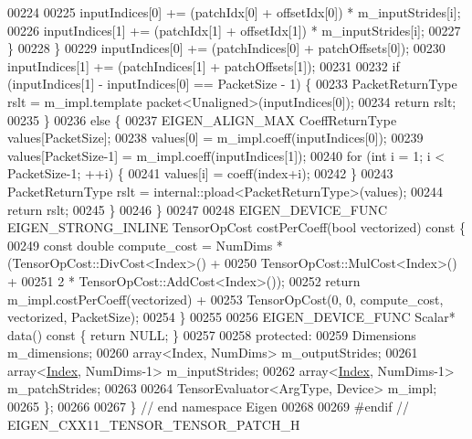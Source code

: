 \begin{DoxyCode}
00224 
00225         inputIndices[0] += (patchIdx[0] + offsetIdx[0]) * m\_inputStrides[i];
00226         inputIndices[1] += (patchIdx[1] + offsetIdx[1]) * m\_inputStrides[i];
00227       \}
00228     \}
00229     inputIndices[0] += (patchIndices[0] + patchOffsets[0]);
00230     inputIndices[1] += (patchIndices[1] + patchOffsets[1]);
00231 
00232     \textcolor{keywordflow}{if} (inputIndices[1] - inputIndices[0] == PacketSize - 1) \{
00233       PacketReturnType rslt = m\_impl.template packet<Unaligned>(inputIndices[0]);
00234       \textcolor{keywordflow}{return} rslt;
00235     \}
00236     \textcolor{keywordflow}{else} \{
00237       EIGEN\_ALIGN\_MAX CoeffReturnType values[PacketSize];
00238       values[0] = m\_impl.coeff(inputIndices[0]);
00239       values[PacketSize-1] = m\_impl.coeff(inputIndices[1]);
00240       \textcolor{keywordflow}{for} (\textcolor{keywordtype}{int} i = 1; i < PacketSize-1; ++i) \{
00241         values[i] = coeff(index+i);
00242       \}
00243       PacketReturnType rslt = internal::pload<PacketReturnType>(values);
00244       \textcolor{keywordflow}{return} rslt;
00245     \}
00246   \}
00247 
00248   EIGEN\_DEVICE\_FUNC EIGEN\_STRONG\_INLINE TensorOpCost costPerCoeff(\textcolor{keywordtype}{bool} vectorized)\textcolor{keyword}{ const }\{
00249     \textcolor{keyword}{const} \textcolor{keywordtype}{double} compute\_cost = NumDims * (TensorOpCost::DivCost<Index>() +
00250                                            TensorOpCost::MulCost<Index>() +
00251                                            2 * TensorOpCost::AddCost<Index>());
00252     \textcolor{keywordflow}{return} m\_impl.costPerCoeff(vectorized) +
00253            TensorOpCost(0, 0, compute\_cost, vectorized, PacketSize);
00254   \}
00255 
00256   EIGEN\_DEVICE\_FUNC Scalar* data()\textcolor{keyword}{ const }\{ \textcolor{keywordflow}{return} NULL; \}
00257 
00258  \textcolor{keyword}{protected}:
00259   Dimensions m\_dimensions;
00260   array<Index, NumDims> m\_outputStrides;
00261   array<\hyperlink{namespace_eigen_a62e77e0933482dafde8fe197d9a2cfde}{Index}, NumDims-1> m\_inputStrides;
00262   array<\hyperlink{namespace_eigen_a62e77e0933482dafde8fe197d9a2cfde}{Index}, NumDims-1> m\_patchStrides;
00263 
00264   TensorEvaluator<ArgType, Device> m\_impl;
00265 \};
00266 
00267 \} \textcolor{comment}{// end namespace Eigen}
00268 
00269 \textcolor{preprocessor}{#endif // EIGEN\_CXX11\_TENSOR\_TENSOR\_PATCH\_H}
\end{DoxyCode}
